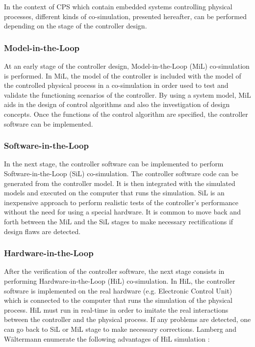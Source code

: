 In the context of CPS which contain embedded systems controlling physical processes, different kinds of co-simulation, presented hereafter, can be performed depending on the stage of the controller design.

\subsubsection{Model-in-the-Loop}

At an early stage of the controller design, Model-in-the-Loop (MiL) co-simulation is performed. In MiL, the model of the controller is included with the model of the controlled physical process in a co-simulation in order used to test and validate the functioning scenarios of the controller. By using a system model, MiL aids in the design of control algorithms and also the investigation of design concepts. Once the functions of the control algorithm are specified, the controller software can be implemented.

\subsubsection{Software-in-the-Loop}

In the next stage, the controller software can be implemented to perform Software-in-the-Loop (SiL) co-simulation. The controller software code can be generated from the controller model. It is then integrated with the simulated models and executed on the computer that runs the simulation. SiL is an inexpensive approach to perform realistic tests of the controller’s performance without the need for using a special hardware. It is common to move back and forth between the MiL and the SiL stages to make necessary rectifications if design flaws are detected.

\subsubsection{Hardware-in-the-Loop}

After the verification of the controller software, the next stage consists in performing Hardware-in-the-Loop (HiL) co-simulation. In HiL, the controller software is implemented on the real hardware (e.g. Electronic Control Unit) which is connected to the computer that runs the simulation of the physical process. HiL must run in real-time in order to imitate the real interactions between the controller and the physical process. If any problems are detected, one can go back to SiL or MiL stage to make necessary corrections. Lamberg and W{\"a}ltermann enumerate the following advantages of HiL simulation \cite{lamberg:2000}:

